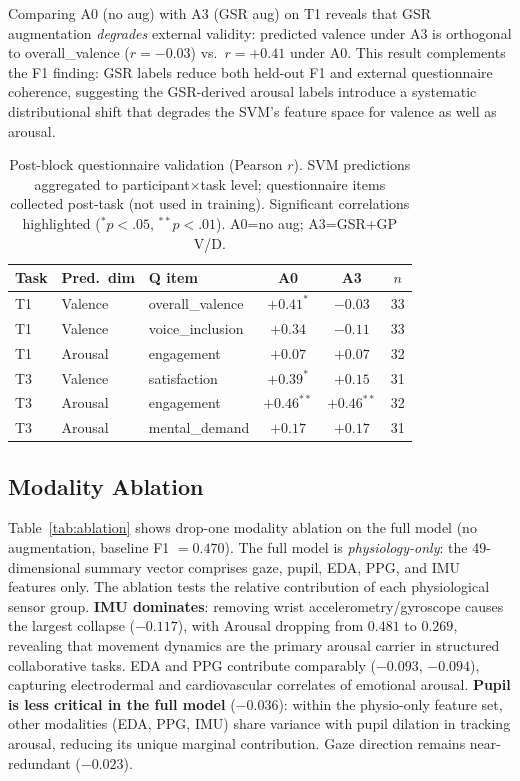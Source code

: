 \documentclass[sigconf,nonacm]{acmart}
\begin{document}
Comparing A0 (no aug) with A3 (GSR aug) on T1 reveals that GSR augmentation
\emph{degrades} external validity: predicted valence under A3 is orthogonal
to overall\_valence ($r{=}{-}0.03$) vs.\ $r{=}+0.41$ under A0.
This result complements the F1 finding: GSR labels reduce both held-out F1
and external questionnaire coherence, suggesting the GSR-derived arousal
labels introduce a systematic distributional shift that degrades the SVM's
feature space for valence as well as arousal.

\begin{table}[t]
\caption{Post-block questionnaire validation (Pearson $r$). SVM predictions
  aggregated to participant$\times$task level; questionnaire items collected
  post-task (not used in training). Significant correlations highlighted
  ($^*p{<}.05$, $^{**}p{<}.01$). A0=no aug; A3=GSR+GP V/D.}
\label{tab:q_corr}
\centering
\setlength{\tabcolsep}{7pt}
\small
\begin{tabular}{lllccc}
\toprule
\textbf{Task} & \textbf{Pred.\ dim} & \textbf{Q item} &
  \textbf{A0} & \textbf{A3} & \textbf{$n$} \\
\midrule
T1 & Valence  & overall\_valence   & $+0.41^{*}$  & $-0.03$      & 33 \\
T1 & Valence  & voice\_inclusion   & $+0.34$       & $-0.11$      & 33 \\
T1 & Arousal  & engagement         & $+0.07$       & $+0.07$      & 32 \\
T3 & Valence  & satisfaction       & $+0.39^{*}$  & $+0.15$      & 31 \\
T3 & Arousal  & engagement         & $+0.46^{**}$ & $+0.46^{**}$& 32 \\
T3 & Arousal  & mental\_demand     & $+0.17$       & $+0.17$      & 31 \\
\bottomrule
\end{tabular}
\end{table}

\subsection{Modality Ablation}

Table~\ref{tab:ablation} shows drop-one modality ablation on the
full model (no augmentation, baseline F1 $= 0.470$).
The full model is \emph{physiology-only}: the 49-dimensional summary vector
comprises gaze, pupil, EDA, PPG, and IMU features only.
The ablation tests the relative contribution of each physiological sensor group.
\textbf{IMU dominates}: removing wrist accelerometry/gyroscope causes
the largest collapse ($-0.117$), with Arousal dropping from $0.481$ to
$0.269$, revealing that movement dynamics are the primary arousal carrier
in structured collaborative tasks.
EDA and PPG contribute comparably ($-0.093$, $-0.094$), capturing
electrodermal and cardiovascular correlates of emotional arousal.
\textbf{Pupil is less critical in the full model} ($-0.036$): within the
physio-only feature set, other modalities (EDA, PPG, IMU) share variance with
pupil dilation in tracking arousal, reducing its unique marginal contribution.
Gaze direction remains near-redundant ($-0.023$).
\end{document}
